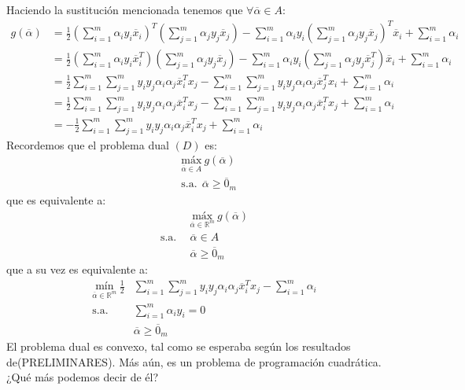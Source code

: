 \documentclass[11pt]{article}
\newcommand{\R}{\mathbb{R}}
\newcommand{\Rm}{\R^{m}}
\newcommand{\av}{\overline{\alpha}}
\newcommand{\x}{\overline{x}}
\newcommand{\zm}{\overline{0}_{m}}
\newcommand{\ali}{\alpha_{i}}
\newcommand{\alj}{\alpha_{j}}
\begin{document}
Haciendo la sustitución mencionada tenemos que $\forall\av\in A$:
\begin{equation*}
\begin{aligned}
g(\av)&=\frac{1}{2}\left(\sum_{i=1}^{m}\ali y_{i}\x_{i}\right)^{T}\left(\sum_{j=1}^{m}\alj y_{j}\x_{j}\right)-\sum_{i=1}^{m}\ali y_{i}\left(\sum_{j=1}^{m}\alj y_{j}\x_{j}\right)^{T}\x_{i} +\sum_{i=1}^{m}\ali\\
&=\frac{1}{2}\left(\sum_{i=1}^{m}\ali y_{i}\x_{i}^{T}\right)\left(\sum_{j=1}^{m}\alj y_{j}\x_{j}\right)-\sum_{i=1}^{m}\ali y_{i}\left(\sum_{j=1}^{m}\alj y_{j}\x_{j}^{T}\right)\x_{i} +\sum_{i=1}^{m}\ali\\
&=\frac{1}{2}\sum_{i=1}^{m}\sum_{j=1}^{m}y_{i}y_{j}\ali\alj\x_{i}^{T}x_{j}-\sum_{i=1}^{m}\sum_{j=1}^{m}y_{i}y_{j}\ali\alj\x_{j}^{T}x_{i}+\sum_{i=1}^{m}\ali\\
&=\frac{1}{2}\sum_{i=1}^{m}\sum_{j=1}^{m}y_{i}y_{j}\ali\alj\x_{i}^{T}x_{j}-\sum_{i=1}^{m}\sum_{j=1}^{m}y_{i}y_{j}\ali\alj\x_{i}^{T}x_{j}+\sum_{i=1}^{m}\ali\\
&=-\frac{1}{2}\sum_{i=1}^{m}\sum_{j=1}^{m}y_{i}y_{j}\ali\alj\x_{i}^{T}x_{j}+\sum_{i=1}^{m}\ali
\end{aligned}
\end{equation*}
Recordemos que el problema dual $(D)$ es:
\begin{equation*}
\begin{aligned}
& \underset{\av\in A}{\text{máx}}\ g(\av) \\
& \text{s.a.}\ \ \av\geq\zm
\end{aligned}
\end{equation*}
que es equivalente a:
\begin{equation*}
\begin{aligned}
& \underset{\av\in\Rm}{\text{máx}}\ g(\av) \\
\text{s.a.}\ \
& \av\in A \\
& \av\geq\zm
\end{aligned}
\end{equation*}
que a su vez es equivalente a:
\begin{equation*}
\begin{aligned}
 \underset{\av\in\Rm}{\text{mín}}\ \frac{1}{2}&\sum_{i=1}^{m}\sum_{j=1}^{m}y_{i}y_{j}\ali\alj\x_{i}^{T}x_{j}-\sum_{i=1}^{m}\ali \\
\text{s.a.}\ \
& \sum_{i=1}^{m}\ali y_{i}=0\\
& \av\geq\zm
\end{aligned}
\end{equation*}
El problema dual es convexo, tal como se esperaba según los resultados de(PRELIMINARES). Más aún, es un problema de programación cuadrática. ¿Qué más podemos decir de él?\\
\end{document}
